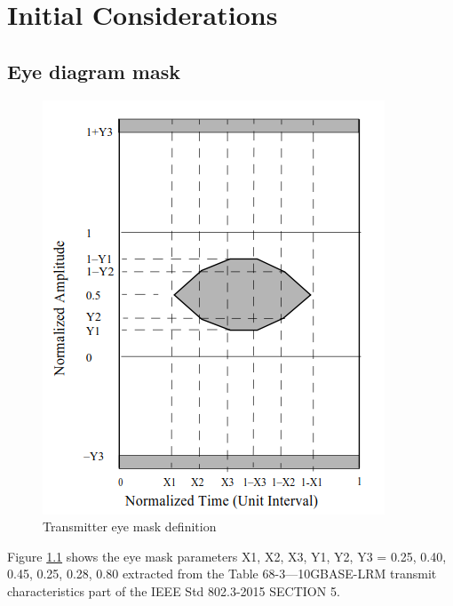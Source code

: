 \documentclass{report}
\begin{document}
\chapter{Initial Considerations}

\section{Eye diagram mask}

\begin{figure}[h!]
\centering
\includegraphics[width=0.70\linewidth]{ieeemask.png}
\caption{Transmitter eye mask definition}
\label{fig:ieeemask}
\end{figure}

Figure \ref{fig:ieeemask} shows the eye mask parameters {X1, X2, X3, Y1, Y2, Y3} = {0.25, 0.40, 0.45, 0.25, 0.28, 0.80} extracted from the Table 68-3---10GBASE-LRM transmit characteristics part of the IEEE Std 802.3-2015 SECTION 5. 
\end{document}
